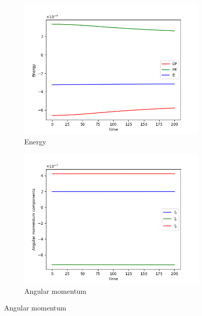 \begin{figure}[htp]
    \centering
    \begin{subfigure}[b]{0.45\textwidth}
        \centering
        \includegraphics[width=\textwidth]{img/bh-cluster/energy.png}
        \caption{Energy}
        \label{fig:physical-quantities-bh-cluster-sub1}
    \end{subfigure}
    \hfill
    \begin{subfigure}[b]{0.45\textwidth}
        \centering
        \includegraphics[width=\textwidth]{img/bh-cluster/angular-momentum.png}
        \caption{Angular momentum}
        \label{fig:physical-quantities-bh-cluster-sub2}
    \end{subfigure}


\end{figure}
